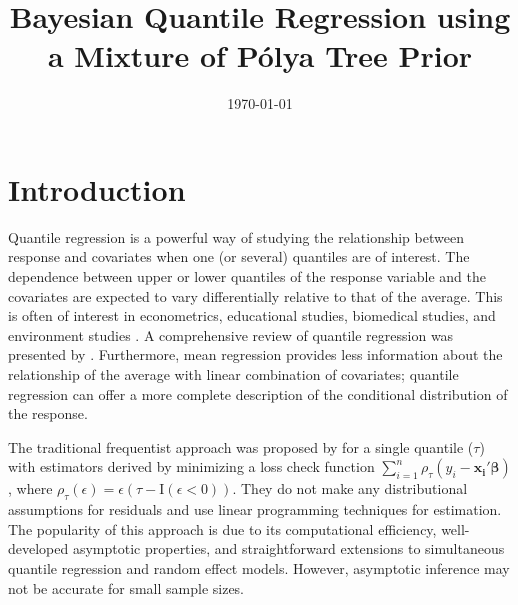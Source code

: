 \documentclass[12pt]{article}
\title{Bayesian Quantile Regression using a  Mixture of P\'{o}lya Tree Prior}
\date{\today}
\author{}
\begin{document}

\maketitle{}

\begin{abstract}
\end{abstract}

\section{Introduction}

Quantile regression is a powerful way of studying the relationship
between response and covariates when one (or several) quantiles are of
interest.  The dependence between upper or lower quantiles of the
response variable and the covariates are expected to vary
differentially relative to that of the average. This is often of
interest in econometrics, educational studies, biomedical studies, and
environment studies \citep{yu2001,buchinsky1994,
  buchinsky1998,he1998,koenker1999, wei2006, yu2003}.  A comprehensive
review of quantile regression was presented by \citet{koenker2005}.
Furthermore, mean regression provides less information about the
relationship of the average with linear combination of covariates;
quantile regression can offer a more complete description of the
conditional distribution of the response.

The traditional frequentist approach was proposed by
\citet{koenker1978} for a single quantile ($\tau$) with estimators
derived by minimizing a loss check function $\sum_{i=1}^n
\rho_{\tau}(y_i - \bm{x_i'\beta})$, where $\rho_{\tau}(\epsilon) =
\epsilon (\tau- \mathrm{I}(\epsilon < 0))$. They do not make any
distributional assumptions for residuals and use linear programming
techniques for estimation.  The popularity of this approach is due to
its computational efficiency, well-developed asymptotic properties,
and straightforward extensions to simultaneous quantile regression and
random effect models. However, asymptotic inference may not be
accurate for small sample sizes.
\end{document}
